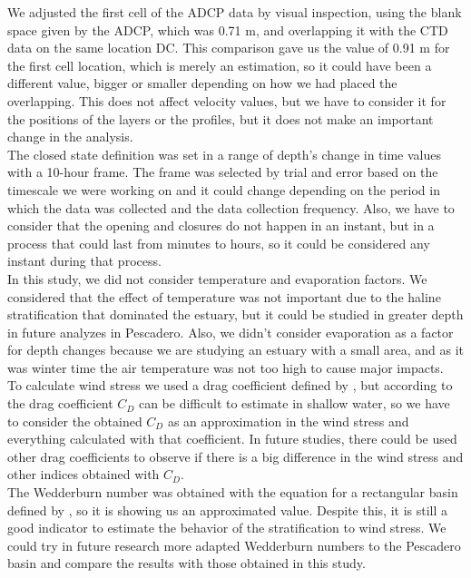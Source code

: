 \documentclass[tesis.tex]{subfiles}
\begin{document}
We adjusted the first cell of the ADCP data by visual inspection, using the blank space given by the ADCP, which was 0.71 m, and overlapping it with the CTD data on the same location DC. This comparison gave us the value of 0.91 m for the first cell location, which is merely an estimation, so it could have been a different value, bigger or smaller depending on how we had placed the overlapping. This does not affect velocity values, but we have to consider it for the positions of the layers or the profiles, but it does not make an important change in the analysis.\\

The closed state definition was set in a range of depth's change in time values with a 10-hour frame. The frame was selected by trial and error based on the timescale we were working on and it could change depending on the period in which the data was collected and the data collection frequency. Also, we have to consider that the opening and closures do not happen in an instant, but in a process that could last from minutes to hours, so it could be considered any instant during that process.\\ 

In this study, we did not consider temperature and evaporation factors. We considered that the effect of temperature was not important due to the haline stratification that dominated the estuary, but it could be studied in greater depth in future analyzes in Pescadero. Also, we didn't consider evaporation as a factor for depth changes because we are studying an estuary with a small area, and as it was winter time the air temperature was not too high to cause major impacts.\\

To calculate wind stress we used a drag coefficient defined by \cite{large1981open}, but according to \cite{paugam2021wind} the drag coefficient $C_D$ can be difficult to estimate in shallow water, so we have to consider the obtained $C_D$ as an approximation in the wind stress and everything calculated with that coefficient. In future studies, there could be used other drag coefficients to observe if there is a big difference in the wind stress and other indices obtained with $C_D$.\\

The Wedderburn number was obtained with the equation for a rectangular basin defined by \cite{Monismith1985}, so it is showing us an approximated value. Despite this, it is still a good indicator to estimate the behavior of the stratification to wind stress. We could try in future research more adapted Wedderburn numbers to the Pescadero basin and compare the results with those obtained in this study.\\
\end{document}
